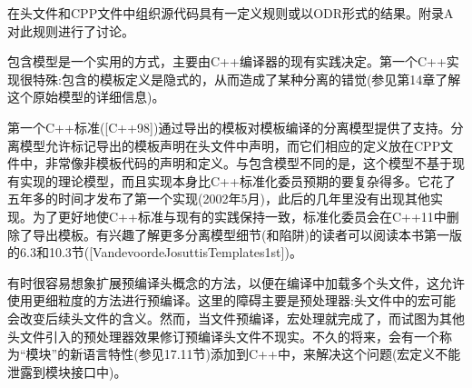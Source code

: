 在头文件和CPP文件中组织源代码具有一定义规则或以ODR形式的结果。附录A对此规则进行了讨论。

包含模型是一个实用的方式，主要由C++编译器的现有实践决定。第一个C++实现很特殊:包含的模板定义是隐式的，从而造成了某种分离的错觉(参见第14章了解这个原始模型的详细信息)。

第一个C++标准([C++98])通过导出的模板对模板编译的分离模型提供了支持。分离模型允许标记导出的模板声明在头文件中声明，而它们相应的定义放在CPP文件中，非常像非模板代码的声明和定义。与包含模型不同的是，这个模型不基于现有实现的理论模型，而且实现本身比C++标准化委员预期的要复杂得多。它花了五年多的时间才发布了第一个实现(2002年5月)，此后的几年里没有出现其他实现。为了更好地使C++标准与现有的实践保持一致，标准化委员会在C++11中删除了导出模板。有兴趣了解更多分离模型细节(和陷阱)的读者可以阅读本书第一版的6.3和10.3节([VandevoordeJosuttisTemplates1st])。

有时很容易想象扩展预编译头概念的方法，以便在编译中加载多个头文件，这允许使用更细粒度的方法进行预编译。这里的障碍主要是预处理器:头文件中的宏可能会改变后续头文件的含义。然而，当文件预编译，宏处理就完成了，而试图为其他头文件引入的预处理器效果修订预编译头文件不现实。不久的将来，会有一个称为“模块”的新语言特性(参见17.11节)添加到C++中，来解决这个问题(宏定义不能泄露到模块接口中)。